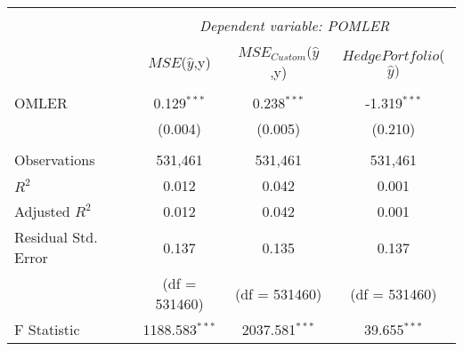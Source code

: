\begin{table}[H] \centering
  \begin{tabular}{@{\extracolsep{5pt}}lccc}
    \\[-1.8ex]\hline
    \hline                                                                                                                                                        \\[-1.8ex]
                        & \multicolumn{3}{c}{\textit{Dependent variable: POMLER}} \
    \cr \cline{3-4}
    \\[-1.8ex] &  $MSE$($\hat{y}$,y) & $MSE_{Custom}$($\hat{y}$,y) & $Hedge Portfolio $($\hat{y})$ \\
    \hline                                                                                                                                                        \\[-1.8ex]
    OMLER   & 0.129$^{***}$                                                                             & 0.238$^{***}$        & -1.319$^{***}$       \\
                        & (0.004)                                                                                   & (0.005)              & (0.210)              \\
    \hline                                                                                                                                                        \\[-1.8ex]
    Observations        & 531,461                                                                                   & 531,461              & 531,461              \\
    $R^2$               & 0.012                                                                                     & 0.042                & 0.001                \\
    Adjusted $R^2$      & 0.012                                                                                     & 0.042                & 0.001                \\
    Residual Std. Error & 0.137                                                                                     & 0.135                & 0.137                \\
                        & (df = 531460)                                                                             & (df = 531460)        & (df = 531460)        \\
    F Statistic         & 1188.583$^{***}$                                                                          & 2037.581$^{***}$     & 39.655$^{***}$       \\

\end{tabular}
\end{table}
